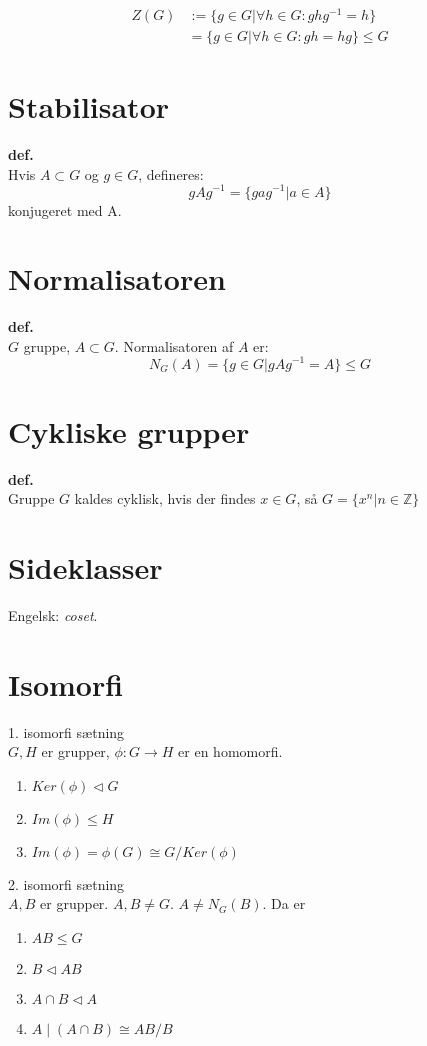 \documentclass{article}
\begin{document}
\begin{align*}
  Z(G) &:= \{ g \in G | \forall h \in G : g h g^{-1} = h \}\\
  &= \{ g \in G | \forall h \in G : gh = hg \} \leq G
\end{align*}
\section*{Stabilisator}
\textbf{def.}\\
Hvis $A \subset G$ og $g \in G$, defineres:\\
$$g A g^{-1} = \{ g a g^{-1} | a \in A\}$$
konjugeret med A.
\section*{Normalisatoren}
\textbf{def.}\\
$G$ gruppe, $A \subset G$. Normalisatoren af $A$ er:\\
$$N_G(A) = \{ g \in G | g A g^{-1} = A\} \leq G$$

\section*{Cykliske grupper}
\textbf{def.}\\
Gruppe $G$ kaldes cyklisk, hvis der findes
$x \in G$, så $G = \{ x^n | n \in \mathbb{Z} \}$

\section*{Sideklasser}
Engelsk: \textit{coset}.\\

\section*{Isomorfi}
1. isomorfi sætning\\
$G, H$ er grupper, $\phi : G \to H$ er en homomorfi.
\begin{enumerate}
  \item $Ker(\phi) \triangleleft G$
  \item $Im(\phi) \leq H$
  \item $Im(\phi) = \phi(G) \cong G / Ker(\phi)$
\end{enumerate}

2. isomorfi sætning\\
$A, B$ er grupper. $A, B \neq G$. $A \neq N_G(B)$. Da er
\begin{enumerate}
  \item $AB \leq G$
  \item $B \triangleleft AB$
  \item $A \cap B \triangleleft A$
  \item $A \mid (A \cap B) \cong AB/B$
\end{enumerate}
\end{document}
